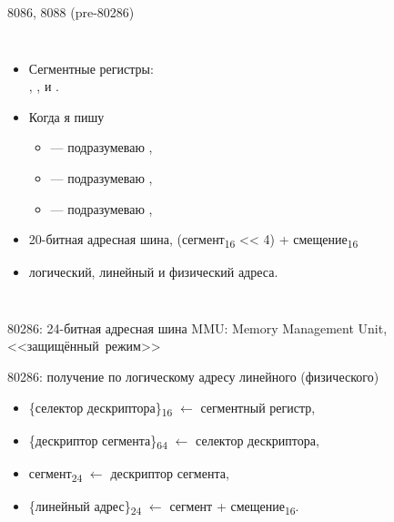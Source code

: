 \begin{frame}{8086, 8088 (pre-80286)}

\pause
\begin{columns}
  \column{5.5cm}
\begin{itemize}[<+->]
    \item Сегментные регистры:\\
    , ,  и .

    \item Когда я пишу
    \begin{itemize}
      \item {} — подразумеваю ,\\
      \item {} — подразумеваю ,

      \item {} — подразумеваю ,
    \end{itemize}

    \item 20-битная адресная шина,
        {\small(сегмент\textsubscript{16} <\hspace{0cm}< 4) + смещение\textsubscript{16}}

    \item логический, линейный и физический адреса.
\end{itemize}

  \column{6.5cm}
    \pause
    \vspace{-.3cm}
\end{columns}
\end{frame}

\begin{frame}{80286: 24-битная адресная шина}
\pause{}MMU: Memory Management Unit, <<защищённый~режим>>
\end{frame}


\begin{frame}{80286: получение по логическому адресу линейного (физического)}

    \pause
    \begin{itemize}[<+->]\itemsep=.5cm
        \item \{селектор дескриптора\}\textsubscript{16} $\leftarrow$
            сегментный регистр,

        \item \{дескриптор сегмента\}\textsubscript{64} $\leftarrow$
            селектор дескриптора,

        \item сегмент\textsubscript{24} $\leftarrow$ дескриптор сегмента,

        \item \{линейный адрес\}\textsubscript{24} $\leftarrow$
            сегмент + смещение\textsubscript{16}.
    \end{itemize}
\end{frame}

